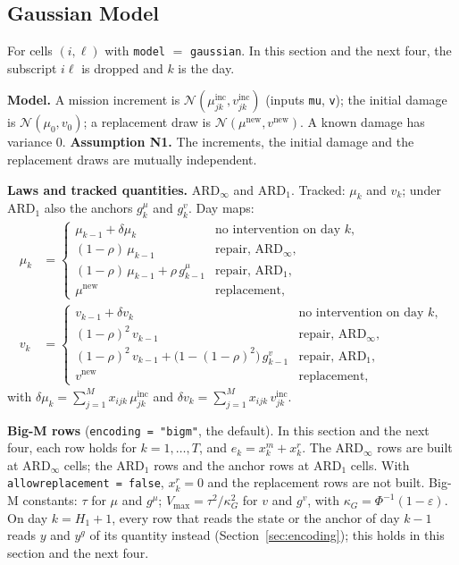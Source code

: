 \documentclass[11pt,a4paper]{article}
\theoremstyle{plain}
\theoremstyle{definition}
\newcommand{\ARDinf}{\mathrm{ARD}_{\infty}}
\newcommand{\ARDone}{\mathrm{ARD}_{1}}
\newcommand{\inc}{\mathrm{inc}}
\newcommand{\new}{\mathrm{new}}
\renewcommand{\_}{\textunderscore\allowbreak{}}
\begin{document}
\subsection{Gaussian Model}
\label{sec:dyn_gaussian}

For cells $(i,\ell)$ with \texttt{model} $=$ \texttt{gaussian}. In this section and
the next four, the subscript $i\ell$ is dropped and $k$ is the day.

\textbf{Model.} A mission increment is $\mathcal{N}(\mu^{\inc}_{jk}, v^{\inc}_{jk})$
(inputs \texttt{mu}, \texttt{v}); the initial damage is $\mathcal{N}(\mu_0, v_0)$; a
replacement draw is $\mathcal{N}(\mu^{\new}, v^{\new})$. A known damage has variance 0.
\textbf{Assumption N1.} The increments, the initial damage and the replacement draws
are mutually independent.

\textbf{Laws and tracked quantities.} $\ARDinf$ and $\ARDone$. Tracked: $\mu_k$ and
$v_k$; under $\ARDone$ also the anchors $g^{\mu}_k$ and $g^{v}_k$. Day maps:
\begin{align}
  \mu_k &= \begin{cases}
    \mu_{k-1} + \delta\mu_k & \text{no intervention on day } k,\\
    (1-\rho)\,\mu_{k-1} & \text{repair, } \ARDinf,\\
    (1-\rho)\,\mu_{k-1} + \rho\, g^{\mu}_{k-1} & \text{repair, } \ARDone,\\
    \mu^{\new} & \text{replacement,}
  \end{cases}
  \label{eq:g_map_mu} \\
  v_k &= \begin{cases}
    v_{k-1} + \delta v_k & \text{no intervention on day } k,\\
    (1-\rho)^2\, v_{k-1} & \text{repair, } \ARDinf,\\
    (1-\rho)^2\, v_{k-1} + \bigl(1 - (1-\rho)^2\bigr)\, g^{v}_{k-1}
      & \text{repair, } \ARDone,\\
    v^{\new} & \text{replacement,}
  \end{cases}
  \label{eq:g_map_v}
\end{align}
with $\delta\mu_k = \sum_{j=1}^{M} x_{ijk}\,\mu^{\inc}_{jk}$ and
$\delta v_k = \sum_{j=1}^{M} x_{ijk}\,v^{\inc}_{jk}$.

\textbf{Big-M rows} (\texttt{encoding = "bigm"}, the default). In this section and
the next four, each row holds for $k = 1, \ldots, T$, and $e_k = x^m_k + x^r_k$. The
$\ARDinf$ rows are built at $\ARDinf$ cells; the $\ARDone$ rows and the anchor rows at
$\ARDone$ cells. With \texttt{allow\_replacement = false}, $x^r_k = 0$ and the
replacement rows are not built. Big-M constants: $\tau$ for $\mu$ and $g^{\mu}$;
$V_{\max} = \tau^2/\kappa_G^2$ for $v$ and $g^{v}$, with
$\kappa_G = \Phi^{-1}(1-\varepsilon)$. On day $k = H_1 + 1$, every row that reads the
state or the anchor of day $k-1$ reads $y$ and $y^{g}$ of its quantity instead
(Section~\ref{sec:encoding}); this holds in this section and the next four.
\end{document}
